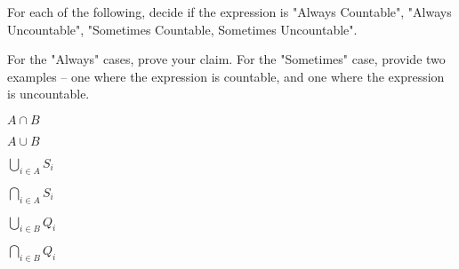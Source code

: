 For each of the following, decide if the expression is
"Always Countable", "Always Uncountable", "Sometimes Countable,
Sometimes Uncountable".

For the "Always" cases, prove your claim. For the "Sometimes" case, provide
two examples -- one where the expression is countable, and one where
the expression is uncountable.

\begin{Parts}

\Part $A \cap B$

\Part $A \cup B$
	
\Part $\bigcup_{i \in A} S_i$

\Part $\bigcap_{i \in A} S_i$

\Part $\bigcup_{i \in B} Q_i$

\Part $\bigcap_{i \in B} Q_i$



\end{Parts}


